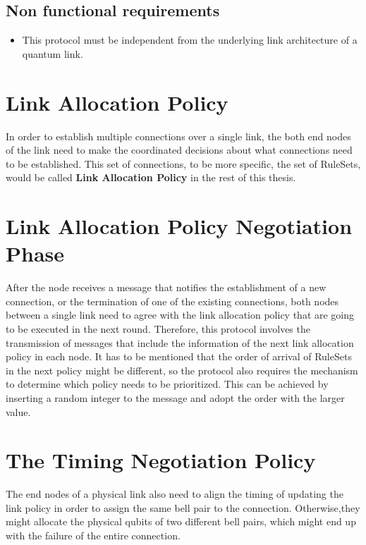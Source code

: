 \subsection{Non functional requirements}

\begin{itemize}
  \item This protocol must be independent from the underlying link architecture of a quantum link.
\end{itemize}

\section{Link Allocation Policy}

In order to establish multiple connections over a single link, the both end nodes of the link need to make the coordinated decisions about what connections need to be established.
This set of connections, to be more specific, the set of RuleSets, would be called \textbf{Link Allocation Policy} in the rest of this thesis.

\section{Link Allocation Policy Negotiation Phase}

After the node receives a message that notifies the establishment of a new connection, or the termination of one of the existing connections, both nodes between a single link need to agree with the link allocation policy that are going to be executed in the next round.
Therefore, this protocol involves the transmission of messages that include the information of the next link allocation policy in each node.  It has to be mentioned that the order of arrival of RuleSets in the next policy might be different, so the protocol also requires the mechanism to determine which policy needs to be prioritized.
This can be achieved by inserting a random integer to the message and adopt the order with the larger value.

\section{The Timing Negotiation Policy}

The end nodes of a physical link also need to align the timing of updating the link policy in order to assign the same bell pair to the connection.
Otherwise,they might allocate the physical qubits of two different bell pairs, which might end up with the failure of the entire connection.

